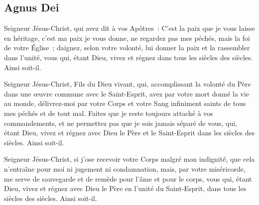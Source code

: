 \subsection*{%
Agnus Dei%
}


%

%

\begin{multicols}{2}
Seigneur Jésus-Christ, qui avez dit à vos Apôtres~: C'est la paix que je vous laisse en héritage, c'est ma paix je vous donne, ne regardez pas mes péchés, mais la foi de votre Église~; daignez, selon votre volonté, lui donner la paix et la rassembler dans l'unité, vous qui, étant Dieu, vivez et régnez dans tous les siècles des siècles. Ainsi soit-il.


Seigneur Jésus-Christ, Fils du Dieu vivant, qui, accomplissant la volonté du Père dans une œuvre commune avec le Saint-Esprit, avez par votre mort donné la vie au monde, délivrez-moi par votre Corps et votre Sang infiniment saints de tous mes péchés et de tout mal. Faites que je reste toujours attaché à vos commandements, et ne permettez pas que je sois jamais séparé de vous, qui, étant Dieu, vivez et régnez avec Dieu le Père et le Saint-Esprit dans les siècles des siècles. Ainsi soit-il.

Seigneur Jésus-Christ, si j'ose recevoir votre Corps malgré mon indignité, que cela n'entraîne pour moi ni jugement ni condamnation, mais, par votre miséricorde, me serve de sauvegarde et de remède pour l'âme et pour le corps, vous qui, étant Dieu, vivez et régnez avec Dieu le Père en l'unité du Saint-Esprit, dans tous les siècles des siècles. Ainsi soit-il.
\end{multicols}

